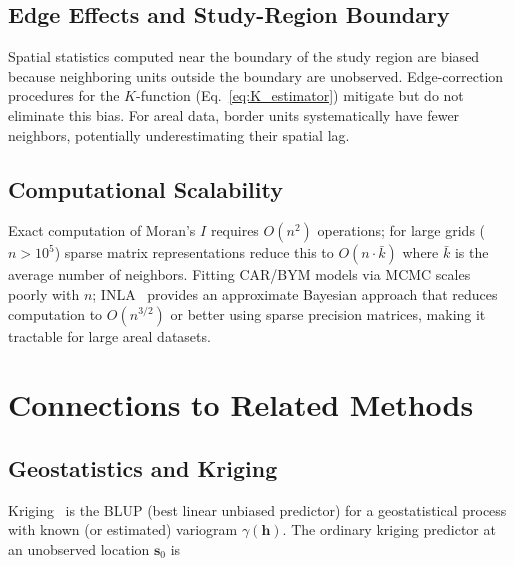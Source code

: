 \documentclass[conference]{IEEEtran}
\theoremstyle{definition}
\begin{document}
\subsection{Edge Effects and Study-Region Boundary}

Spatial statistics computed near the boundary of the study region are biased because neighboring units outside the boundary are unobserved. Edge-correction procedures for the $K$-function (Eq.~\eqref{eq:K_estimator}) mitigate but do not eliminate this bias. For areal data, border units systematically have fewer neighbors, potentially underestimating their spatial lag.

\subsection{Computational Scalability}

Exact computation of Moran's $I$ requires $O(n^2)$ operations; for large grids ($n > 10^5$) sparse matrix representations reduce this to $O(n \cdot \bar{k})$ where $\bar{k}$ is the average number of neighbors. Fitting CAR/BYM models via MCMC scales poorly with $n$; INLA~\cite{rue2009} provides an approximate Bayesian approach that reduces computation to $O(n^{3/2})$ or better using sparse precision matrices, making it tractable for large areal datasets.

\section{Connections to Related Methods}
\label{sec:connections}

\subsection{Geostatistics and Kriging}

Kriging~\cite{matheron1963} is the BLUP (best linear unbiased predictor) for a geostatistical process with known (or estimated) variogram $\gamma(\mathbf{h})$. The ordinary kriging predictor at an unobserved location $\mathbf{s}_0$ is
\end{document}
